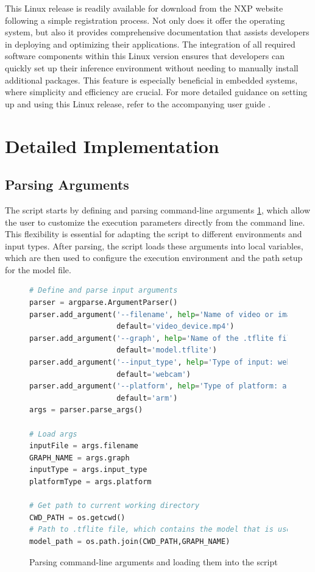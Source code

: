 This Linux release is readily available for download from the NXP website following a simple registration process. Not only does it offer the operating system, but also it provides comprehensive documentation that assists developers in deploying and optimizing their applications. The integration of all required software components within this Linux version ensures that developers can quickly set up their inference environment without needing to manually install additional packages. This feature is especially beneficial in embedded systems, where simplicity and efficiency are crucial. For more detailed guidance on setting up and using this Linux release, refer to the accompanying user guide \cite{iMX_LINUX_USERS_GUIDE}.

\section{Detailed Implementation}

\subsection{Parsing Arguments}
The script starts by defining and parsing command-line arguments \ref{code:arg_parsing}, which allow the user to customize the execution parameters directly from the command line. This flexibility is essential for adapting the script to different environments and input types. After parsing, the script loads these arguments into local variables, which are then used to configure the execution environment and the path setup for the model file.

\begin{figure}[H]
\begin{lstlisting}[language=Python]
# Define and parse input arguments
parser = argparse.ArgumentParser()
parser.add_argument('--filename', help='Name of video or image input file',
                    default='video_device.mp4')
parser.add_argument('--graph', help='Name of the .tflite file, if different than model.tflite',
                    default='model.tflite')
parser.add_argument('--input_type', help='Type of input: webcam, videofile',
                    default='webcam')
parser.add_argument('--platform', help='Type of platform: arm, x64',
                    default='arm')
args = parser.parse_args()

# Load args
inputFile = args.filename
GRAPH_NAME = args.graph
inputType = args.input_type
platformType = args.platform

# Get path to current working directory
CWD_PATH = os.getcwd()
# Path to .tflite file, which contains the model that is used for object detection
model_path = os.path.join(CWD_PATH,GRAPH_NAME)
\end{lstlisting}
\caption{Parsing command-line arguments and loading them into the script}
\label{code:arg_parsing}
\end{figure}

